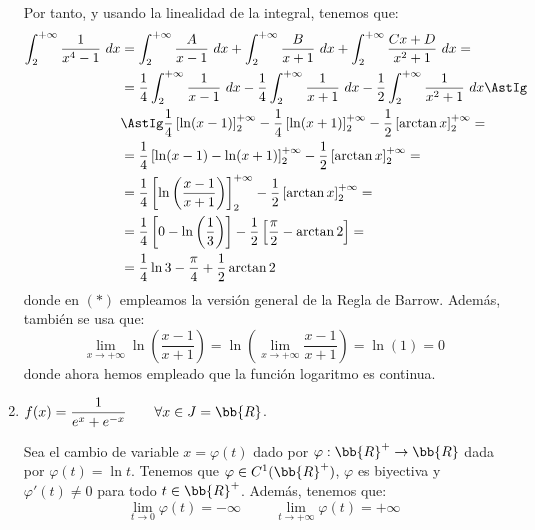 \begin{ejercicio}
\begin{enumerate}
        Por tanto, y usando la linealidad de la integral, tenemos que:
        \begin{align*}
            \int_2^{+\infty} \dfrac{1}{x^4-1}~dx
            &= \int_2^{+\infty} \dfrac{A}{x-1}~dx
            + \int_2^{+\infty} \dfrac{B}{x+1}~dx
            + \int_2^{+\infty} \dfrac{Cx+D}{x^2+1}~dx
            =\\&= \frac{1}{4}\int_2^{+\infty} \dfrac{1}{x-1}~dx
            - \frac{1}{4}\int_2^{+\infty} \dfrac{1}{x+1}~dx
            - \frac{1}{2}\int_2^{+\infty} \dfrac{1}{x^2+1}~dx
            \AstIg\\&\AstIg \frac{1}{4}\left[\ln(x-1)\right]_2^{+\infty}
            - \frac{1}{4}\left[\ln(x+1)\right]_2^{+\infty}
            - \frac{1}{2}\left[\arctan x\right]_2^{+\infty}
            =\\&= \frac{1}{4}\left[\ln(x-1) - \ln(x+1)\right]_2^{+\infty}
            - \frac{1}{2}\left[\arctan x\right]_2^{+\infty}
            =\\&= \frac{1}{4}\left[\ln\left(\frac{x-1}{x+1}\right)\right]_2^{+\infty}
            - \frac{1}{2}\left[\arctan x\right]_2^{+\infty}
            =\\&= \frac{1}{4}\left[0 - \ln\left(\frac{1}{3}\right)\right] - \frac{1}{2}\left[\frac{\pi}{2} - \arctan 2\right]
            =\\&= \frac{1}{4}\ln 3 - \frac{\pi}{4} + \frac{1}{2}\arctan 2 
        \end{align*}
        donde en $(\ast)$ empleamos la versión general de la Regla de Barrow. Además, también se usa que:
        \begin{equation*}
            \lim_{x\to +\infty} \ln\left(\frac{x-1}{x+1}\right)
            = \ln\left(\lim_{x\to +\infty}\frac{x-1}{x+1}\right)
            = \ln(1) = 0
        \end{equation*}
        donde ahora hemos empleado que la función logaritmo es continua.
        


        \item $f(x)=\dfrac{1}{e^x+e^{-x}} \qquad \forall x\in J=\bb{R}$.
        
        Sea el cambio de variable $x=\varphi(t)$ dado por $\varphi:\bb{R}^+\to \bb{R}$ dada por $\varphi(t)=\ln t$.
        Tenemos que $\varphi\in C^1(\bb{R}^+)$, $\varphi$ es biyectiva y $\varphi'(t)\neq 0$ para todo $t\in \bb{R}^+$.
        Además, tenemos que:
        \begin{equation*}
            \lim_{t\to 0} \varphi(t) = -\infty \hspace{1cm} \lim_{t\to +\infty} \varphi(t) = +\infty
        \end{equation*}


\end{enumerate}
\end{ejercicio}
